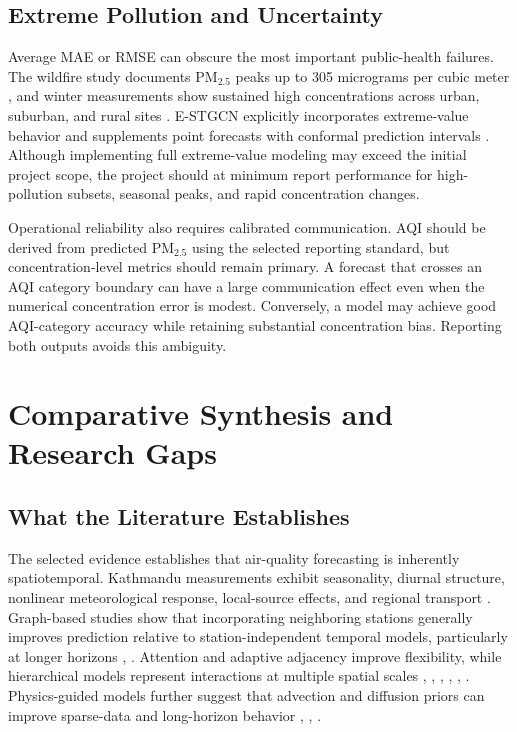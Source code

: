 \subsection{Extreme Pollution and Uncertainty}

Average MAE or RMSE can obscure the most important public-health failures. The wildfire study documents PM$_{2.5}$ peaks up to 305 micrograms per cubic meter \cite{ref6}, and winter measurements show sustained high concentrations across urban, suburban, and rural sites \cite{ref4}. E-STGCN explicitly incorporates extreme-value behavior and supplements point forecasts with conformal prediction intervals \cite{ref33}. Although implementing full extreme-value modeling may exceed the initial project scope, the project should at minimum report performance for high-pollution subsets, seasonal peaks, and rapid concentration changes.

Operational reliability also requires calibrated communication. AQI should be derived from predicted PM$_{2.5}$ using the selected reporting standard, but concentration-level metrics should remain primary. A forecast that crosses an AQI category boundary can have a large communication effect even when the numerical concentration error is modest. Conversely, a model may achieve good AQI-category accuracy while retaining substantial concentration bias. Reporting both outputs avoids this ambiguity.

\section{Comparative Synthesis and Research Gaps}

\subsection{What the Literature Establishes}

The selected evidence establishes that air-quality forecasting is inherently spatiotemporal. Kathmandu measurements exhibit seasonality, diurnal structure, nonlinear meteorological response, local-source effects, and regional transport \cite{ref1,ref2,ref3,ref4,ref5,ref6,ref7,ref8,ref9,ref10}. Graph-based studies show that incorporating neighboring stations generally improves prediction relative to station-independent temporal models, particularly at longer horizons \cite{ref13,ref14,ref15,ref16,ref17,ref18,ref19,ref20,ref21,ref22,ref23,ref24,ref25}, \cite{ref34}. Attention and adaptive adjacency improve flexibility, while hierarchical models represent interactions at multiple spatial scales \cite{ref16}, \cite{ref17}, \cite{ref19}, \cite{ref25}, \cite{ref30}, \cite{ref34}. Physics-guided models further suggest that advection and diffusion priors can improve sparse-data and long-horizon behavior \cite{ref24}, \cite{ref31}, \cite{ref32}.


